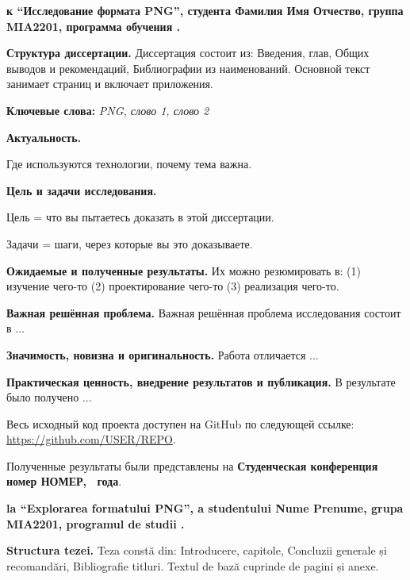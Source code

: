 \documentclass[a4paper,12pt]{report}
\newcommand{\uniGroupName}{MIA2201}
\newcommand{\authorName}{Nume Prenume}
\newcommand{\authorNameRu}{Фамилия Имя Отчество}
\newcommand{\docTitleRo}{Explorarea formatului PNG}
\newcommand{\docTitleRu}{Исследование формата PNG}
\newcommand{\yearOfWriting}{\the\year}
\newcommand{\conferencesList}{Студенческая конференция номер НОМЕР, \yearOfWriting~года}
\newcommand{\github}{\url{https://github.com/USER/REPO}}
\begin{document}
\titlePage

\clearpage
\tableofcontents


\textbf{к \docTypeRuDatelny{} \enquote{\docTitleRu{}}, студента \authorNameRu{}, группа \uniGroupName{}, программа обучения \programulDeStudiiRu.}

\textbf{Структура диссертации.}
Диссертация состоит из: Введения, \chapterCount{} глав, Общих выводов и рекомендаций, Библиографии из \bibliographyEntryCount{} наименований.
Основной текст занимает \usefulPageCount{} страниц и включает \anexeCount{} приложения.

\textbf{Ключевые слова:}
\textit{\acrshort{PNG}, слово 1, слово 2}

\textbf{Актуальность.}

Где используются технологии, почему тема важна.

\textbf{Цель и задачи исследования.}

Цель = что вы пытаетесь доказать в этой диссертации.

Задачи = шаги, через которые вы это доказываете.

\textbf{Ожидаемые и полученные результаты.}
Их можно резюмировать в:
(1) изучение чего-то
(2) проектирование чего-то
(3) реализация чего-то.

\textbf{Важная решённая проблема.}
Важная решённая проблема исследования состоит в ...

\textbf{Значимость, новизна и оригинальность.}
Работа отличается ...

\textbf{Практическая ценность, внедрение результатов и публикация.}
В результате было получено ...

Весь исходный код проекта доступен на GitHub по следующей ссылке: \github.

Полученные результаты были представлены на \textbf{\conferencesList}\cite{self}.


\textbf{la \docTypeRoNedefinit{} \enquote{\docTitleRo{}}, a studentului \authorName{}, grupa \uniGroupName{}, programul de studii \programulDeStudiiRo.}

\textbf{Structura tezei.}
Teza constă din: Introducere, \chapterCount{} capitole, Concluzii generale și recomandări, Bibliografie \bibliographyEntryCount{} titluri.
Textul de bază cuprinde \usefulPageCount{} de pagini și \anexeCount{} anexe.
\end{document}
